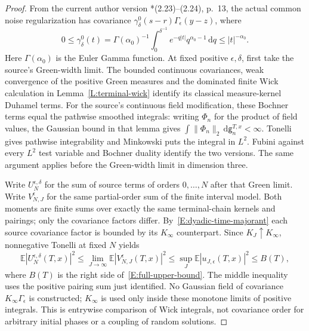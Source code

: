 \documentclass[12pt]{article}
\numberwithin{equation}{section}
\theoremstyle{definition}
\newcommand{\E}{\mathbb{E}}
\newcommand{\ud}{\,\mathrm{d}}
\begin{document}
\begin{proof}
  From the current author version
  \cite{chen:author2026:time-dependency}*{(2.23)--(2.24), p.~13},
  the actual common noise regularization has covariance
  $\gamma_\delta^0(s-r)\Gamma_\epsilon(y-z)$, where
  \[
    0\le\gamma_\delta^0(t)
    =\Gamma(\alpha_0)^{-1}\int_0^{\delta^{-1}}
    e^{-q|t|}q^{\alpha_0-1}\ud q
    \le |t|^{-\alpha_0}.
  \]
  Here $\Gamma(\alpha_0)$ is the Euler Gamma function.
  At fixed positive $\epsilon,\delta$, first take the source's Green-width
  limit. The bounded continuous covariances, weak convergence of the
  positive Green measures and the dominated finite Wick calculation in
  Lemma~\ref{L:terminal-wick} identify its classical measure-kernel
  Duhamel terms. For the source's continuous field modification, these
  Bochner terms equal the pathwise smoothed integrals: writing $\Phi_n$
  for the product of field values, the Gaussian bound in that lemma gives
  $\int\|\Phi_n\|_2\ud\mathsf g_n^{T,x}<\infty$.
  Tonelli gives pathwise integrability and Minkowski puts the integral
  in $L^2$. Fubini against every $L^2$ test variable and Bochner duality
  identify the two versions. The same argument applies before the
  Green-width limit in dimension three.

  Write $U_N^{\epsilon,\delta}$ for the sum of source terms of orders
  $0,\ldots,N$ after that Green limit. Write $V_{N,J}^\epsilon$ for the
  same partial-order sum of the finite interval model. Both moments are
  finite sums over exactly the same terminal-chain kernels and pairings;
  only the covariance factors differ. By~\eqref{E:dyadic-time-majorant}
  each source covariance factor is bounded by its $K_\infty$ counterpart.
  Since $K_J\uparrow K_\infty$, nonnegative Tonelli at fixed $N$ yields
  \begin{equation}\label{E:interval-source-comparison}
    \E|U_N^{\epsilon,\delta}(T,x)|^2
    \le\lim_{J\to\infty}\E|V_{N,J}^\epsilon(T,x)|^2
    \le\sup_J\E|u_{J,\epsilon}(T,x)|^2\le B(T),
  \end{equation}
  where $B(T)$ is the right side of~\eqref{E:full-upper-bound}.
  The middle inequality uses the positive pairing sum just identified.
  No Gaussian field of covariance $K_\infty\Gamma_\epsilon$ is constructed;
  $K_\infty$ is used only inside these monotone limits of positive integrals.
  This is entrywise comparison of Wick integrals, not covariance order
  for arbitrary initial phases or a coupling of random solutions.


\end{proof}
\end{document}
